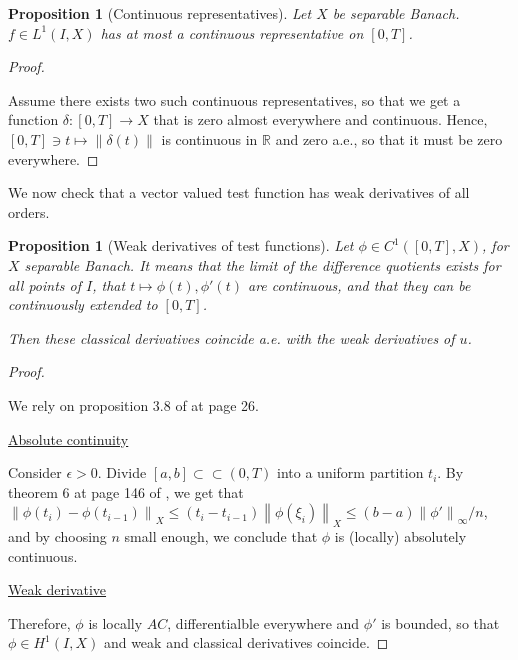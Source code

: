 \documentclass[english,a4paper,10pt,oneside]{scrbook}	%
\theoremstyle{break}
\newtheorem{prop}[equation]{Proposition}
\newenvironment{mproof}[1][\proofname]{%
  \begin{proof}[#1]$ $\par\nobreak\ignorespaces
}{%
  \end{proof}
}
\renewcommand*{\proofname}{Proof}
\theoremstyle{remark}
\newcommand{\mR}{\mathbb{R}}
\newcommand{\ds}{\displaystyle}
\newcommand{\norm}[1]{\left\lVert#1\right\rVert}
\newcommand{\cc}{\subset\subset}
\newcommand{\emb}{\hookrightarrow}
\begin{document}
\begin{prop}[Continuous representatives]
\label{prop:cts_repr}
Let $X$ be separable Banach. $f \in L^1(I,X)$ has at most a continuous representative on $[0,T]$.
\end{prop}
\begin{mproof}
Assume there exists two such continuous representatives, so that we get a function $\delta: [0,T] \rightarrow X$ that is zero almost everywhere and continuous. Hence, $[0,T] \ni t \mapsto \norm{\delta(t)}$ is continuous in $\mR$ and zero a.e., so that it must be zero everywhere.
\end{mproof}

%
%
%

We now check that a vector valued test function has weak derivatives of all orders.

\begin{prop}[Weak derivatives of test functions]
\label{prop:weak_class}
Let $\phi \in C^1([0,T],X)$, for $X$ separable Banach. It means that the limit of the difference quotients exists for all points of $I$, that $t\mapsto \phi(t), \phi'(t)$ are continuous, and that they can be continuously extended to $[0,T]$.

Then these classical derivatives coincide a.e. with the weak derivatives of $u$.

\end{prop}
\begin{mproof}


We rely on proposition 3.8 of \cite{kreuter} at page 26.

\underline{Absolute continuity}

Consider $\epsilon >0$. Divide $[a,b] \cc (0,T)$ into a uniform partition $t_i$. By theorem 6 at page 146 of \cite{mvt}, we get that $\ds \norm{\phi(t_i)-\phi(t_{i-1})}_X \leq (t_i-t_{i-1})\norm{\phi(\xi_i)}_X\leq (b-a) \norm{\phi'}_{\infty}/n$, and by choosing $n$ small enough, we conclude that $\phi$ is (locally) absolutely continuous.

\underline{Weak derivative}

Therefore, $\phi$ is locally $AC$, differentialble everywhere and $\phi'$ is bounded, so that $\phi \in H^1(I,X)$ and weak and classical derivatives coincide. 

\end{mproof}
\end{document}
